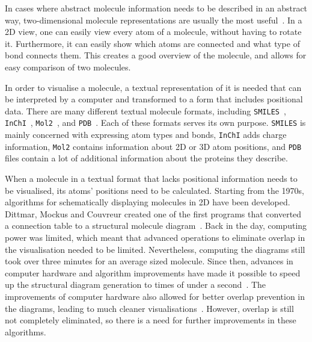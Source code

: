 In cases where abstract molecule information needs to be described in an abstract way, two-dimensional molecule representations are usually the most useful~\cite{zhou2009molecular}. In a 2D view, one can easily view every atom of a molecule, without having to rotate it. Furthermore, it can easily show which atoms are connected and what type of bond connects them. This creates a good overview of the molecule, and allows for easy comparison of two molecules.

In order to visualise a molecule, a textual representation of it is needed that can be interpreted by a computer and transformed to a form that includes positional data. There are many different textual molecule formats, including \verb|SMILES|~\cite{daylight1992daylight}, \verb|InChI|~\cite{heller2013inchi}, \verb|Mol2|~\cite{tripos2005tripos}, and \verb|PDB|~\cite{bernstein1977protein}. Each of these formats serves its own purpose. \verb|SMILES| is mainly concerned with expressing atom types and bonds, \verb|InChI| adds charge information, \verb|Mol2| contains information about 2D or 3D atom positions, and \verb|PDB| files contain a lot of additional information about the proteins they describe.

When a molecule in a textual format that lacks positional information needs to be visualised, its atoms' positions need to be calculated. Starting from the 1970s, algorithms for schematically displaying molecules in 2D have been developed. Dittmar, Mockus and Couvreur created one of the first programs that converted a connection table to a structural molecule diagram~\cite{dittmar1977algorithmic}. Back in the day, computing power was limited, which meant that advanced operations to eliminate overlap in the visualisation needed to be limited. Nevertheless, computing the diagrams still took over three minutes for an average sized molecule. Since then, advances in computer hardware and algorithm improvements have made it possible to speed up the structural diagram generation to times of under a second~\cite{fricker2004automated}. The improvements of computer hardware also allowed for better overlap prevention in the diagrams, leading to much cleaner visualisations~\cite{clark2006structure}. However, overlap is still not completely eliminated, so there is a need for further improvements in these algorithms.

